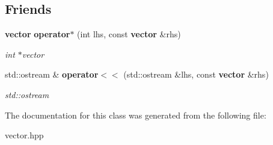 \subsection*{Friends}
\begin{DoxyCompactItemize}
\item 
{\bf vector} {\bf operator$\ast$} (int lhs, const {\bf vector} \&rhs)\label{classvector_a5d2725eb5caa736afe55c1b899b700c7}

\begin{DoxyCompactList}\small\item\em int $\ast$vector \end{DoxyCompactList}\item 
std\+::ostream \& {\bf operator$<$$<$} (std\+::ostream \&lhs, const {\bf vector} \&rhs)\label{classvector_a7a6813f75dabd6f9575f9d6f91890255}

\begin{DoxyCompactList}\small\item\em std\+::ostream \end{DoxyCompactList}\end{DoxyCompactItemize}


The documentation for this class was generated from the following file\+:\begin{DoxyCompactItemize}
\item 
vector.\+hpp\end{DoxyCompactItemize}
